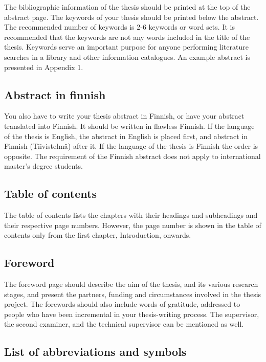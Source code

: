 The bibliographic information of the thesis should be printed at the top of the abstract page. The keywords of your thesis should be printed below the abstract. The recommended number of keywords is 2-6 keywords or word sets. It is recommended that the keywords are not any words included in the title of the thesis. Keywords serve an important purpose for anyone performing literature searches in a library and other information catalogues. An example abstract is presented in Appendix 1.

\subsection{Abstract in finnish}

You also have to write your thesis abstract in Finnish, or have your abstract translated into Finnish. It should be written in flawless Finnish. If the language of the thesis is English, the abstract in English is placed first, and abstract in Finnish (Tiivistelmä) after it. If the language of the thesis is Finnish the order is opposite. The requirement of the Finnish abstract does not apply to international master’s degree students.

\subsection{Table of contents}

The table of contents lists the chapters with their headings and subheadings and their respective page numbers. However, the page number is shown in the table of contents only from the first chapter, Introduction, onwards.

\subsection{Foreword}

The foreword page should describe the aim of the thesis, and its various research stages, and present the partners, funding and circumstances involved in the thesis project. The forewords should also include words of gratitude, addressed to people who have been incremental in your thesis-writing process. The supervisor, the second examiner, and the technical supervisor can be mentioned as well.

\subsection{List of abbreviations and symbols}


